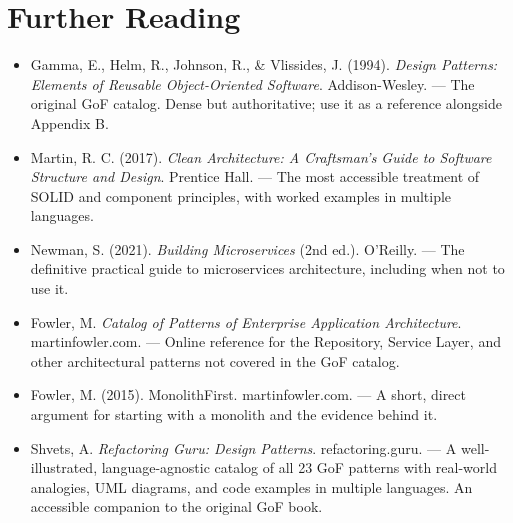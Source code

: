 \documentclass[11pt,a4paper]{book}
\begin{document}
\medskip

\section{Further Reading}

\begin{itemize}
  \item Gamma, E., Helm, R., Johnson, R., \& Vlissides, J. (1994). \textit{Design Patterns: Elements of Reusable Object-Oriented Software}. Addison-Wesley. --- The original GoF catalog. Dense but authoritative; use it as a reference alongside Appendix B.
\end{itemize}

\begin{itemize}
  \item Martin, R. C. (2017). \textit{Clean Architecture: A Craftsman's Guide to Software Structure and Design}. Prentice Hall. --- The most accessible treatment of SOLID and component principles, with worked examples in multiple languages.
\end{itemize}

\begin{itemize}
  \item Newman, S. (2021). \textit{Building Microservices} (2nd ed.). O'Reilly. --- The definitive practical guide to microservices architecture, including when not to use it.
\end{itemize}

\begin{itemize}
  \item Fowler, M. \textit{Catalog of Patterns of Enterprise Application Architecture}. martinfowler.com. --- Online reference for the Repository, Service Layer, and other architectural patterns not covered in the GoF catalog.
\end{itemize}

\begin{itemize}
  \item Fowler, M. (2015). MonolithFirst. martinfowler.com. --- A short, direct argument for starting with a monolith and the evidence behind it.
\end{itemize}

\begin{itemize}
  \item Shvets, A. \textit{Refactoring Guru: Design Patterns}. refactoring.guru. --- A well-illustrated, language-agnostic catalog of all 23 GoF patterns with real-world analogies, UML diagrams, and code examples in multiple languages. An accessible companion to the original GoF book.
\end{itemize}
\end{document}
